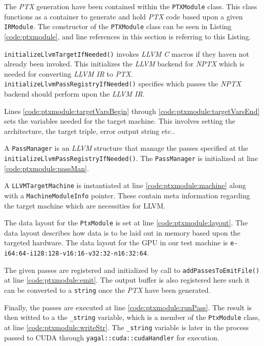 The \textit{PTX} generation have been contained within the \texttt{PTXModule} class. This class functions as a container to generate and hold \textit{PTX} code based upon a given \texttt{IRModule}. The constructor of the \texttt{PTXModule} class can be seen in Listing \ref{code:ptxmodule}, and line references in this section is referring to this Listing. 

\texttt{initializeLlvmTargetIfNeeded()} invokes \textit{LLVM C} macros if they haven not already been invoked. This initializes the \textit{LLVM} backend for \textit{NPTX} which is needed for converting \textit{LLVM IR} to \textit{PTX}. \texttt{initializeLlvmPassRegistryIfNeeded()} specifies which passes the \textit{NPTX} backend should perform upon the \textit{LLVM IR}.

Lines \ref{code:ptxmodule:targetVarsBegin} through \ref{code:ptxmodule:targetVarsEnd} sets the variables needed for the target machine. This involves setting the architecture, the target triple, error output string etc.. 

A \texttt{PassManager} is an \textit{LLVM} structure that manage the passes specified at the \texttt{initializeLlvmPassRegistryIfNeeded()}. The \texttt{PassManager} is initialized at line \ref{code:ptxmodule:passMan}. 


A \texttt{LLVMTargetMachine} is instantiated at line \ref{code:ptxmodule:machine} along with a \texttt{MachineModuleInfo} pointer. These contain meta information regarding the target machine which are necessities for LLVM.

The data layout for the \texttt{PtxModule} is set at line \ref{code:ptxmodule:layout}. The data layout describes how data is to be laid out in memory based upon the targeted hardware. The data layout for the GPU in our test machine is \texttt{e-i64:64-i128:128-v16:16-v32:32-n16:32:64}.

The given passes are registered and initialized by call to \texttt{addPassesToEmitFile()} at line \ref{code:ptxmodule:emit}. The output buffer is also registered here such it can be converted to a \texttt{string} once the \textit{PTX} have been generated.

Finally, the passes are executed at line \ref{code:ptxmodule:runPass}. The result is then witted to a the \texttt{\_string} variable, which is a member of the \texttt{PtxModule} class, at line \ref{code:ptxmodule:writeStr}. The \texttt{\_string} variable is later in the process passed to CUDA through \texttt{yagal::cuda::cudaHandler} for execution.

